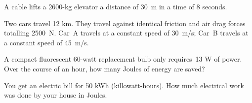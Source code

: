 \documentclass[10pt]{exam}
\begin{document}
\begin{questions}
  \question 
    A cable lifts a 2600-kg elevator a distance of 30~m in a time of 8 seconds.  
    
  \pagebreak 
  \question
    Two cars travel 12 km.  They travel against identical friction and air drag forces totalling 2500~N.  Car~A travels at a constant speed of 30~m/s; Car~B travels at a constant speed of 45~m/s.


      
    \question
      A compact fluorescent 60-watt replacement bulb only requires~13 W of power. Over the course of an hour, how many Joules of energy are saved?
      \vs[3]


  \question
    You get an electric bill for 50 kWh (killowatt-hours). How much electrical work was done by your house in Joules.
    \vs[3]
  
\end{questions}
\end{document}
